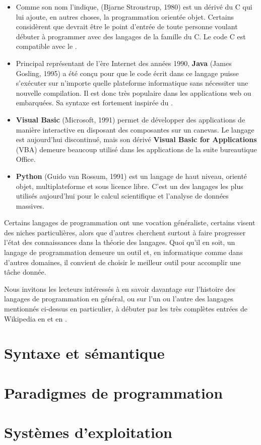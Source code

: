 \begin{itemize}
\item Comme son nom l'indique, \textbf{\Cpp} (Bjarne Stroustrup, 1980)
  est un dérivé du C qui lui ajoute, en autres choses, la
  programmation orientée objet. Certains considèrent que {\Cpp}
  devrait être le point d'entrée de toute personne voulant débuter à
  programmer avec des langages de la famille du C. Le code C est
  compatible avec le \Cpp.
\item Principal représentant de l'ère Internet des années 1990,
  \textbf{Java} (James Gosling, 1995) a été conçu pour que le code
  écrit dans ce langage puisse s'exécuter sur n'importe quelle
  plateforme informatique sans nécessiter une nouvelle compilation. Il
  est donc très populaire dans les applications web ou embarquées. Sa
  syntaxe est fortement inspirée du \Cpp.
\item \textbf{Visual Basic} (Microsoft, 1991) permet de développer des
  applications de manière interactive en disposant des composantes sur
  un canevas. Le langage est aujourd'hui discontinué, mais son dérivé
  \textbf{Visual Basic for Applications} (VBA) demeure beaucoup
  utilisé dans les applications de la suite bureautique Office.
\item \textbf{Python} (Guido van Rossum, 1991) est un langage de haut
  niveau, orienté objet, multiplateforme et sous licence libre. C'est
  un des langages les plus utilisés aujourd'hui pour le calcul
  scientifique et l'analyse de données massives.
\end{itemize}

Certains langages de programmation ont une vocation généraliste,
certains visent des niches particulières, alors que d'autres cherchent
surtout à faire progresser l'état des connaissances dans la théorie
des langages. Quoi qu'il en soit, un langage de programmation demeure
un outil et, en informatique comme dans d'autres domaines, il convient
de choisir le meilleur outil pour accomplir une tâche donnée.

Nous invitons les lecteurs intéressés à en savoir davantage sur
l'histoire des langages de programmation en général, ou sur l'un ou
l'autre des langages mentionnés ci-dessus en particulier, à débuter
par les très complètes entrées de Wikipedia en
et en
.


\section{Syntaxe et sémantique}
\label{sec:informatique:syntaxe}

\section{Paradigmes de programmation}
\label{sec:informatique:paradigmes}

\section{Systèmes d'exploitation}
\label{sec:informatique:os}



